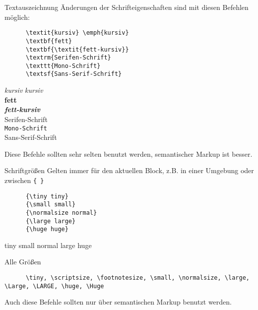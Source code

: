 \begin{frame}[fragile]{Textauszeichnung}
  Änderungen der Schrifteigenschaften sind mit diesen Befehlen möglich:
  \begin{CodeExample}{0.60}
    \begin{lstlisting}
      \textit{kursiv} \emph{kursiv}
      \textbf{fett}
      \textbf{\textit{fett-kursiv}}
      \textrm{Serifen-Schrift}
      \texttt{Mono-Schrift}
      \textsf{Sans-Serif-Schrift}
    \end{lstlisting}
  \CodeResult
    \textit{kursiv} \emph{kursiv} \\
    \textbf{fett} \\
    \textbf{\textit{fett-kursiv}} \\
    \textrm{Serifen-Schrift} \\
    \texttt{Mono-Schrift} \\
    \textsf{Sans-Serif-Schrift}
  \end{CodeExample}

  \vspace{1em}
  Diese Befehle sollten sehr selten benutzt werden, semantischer Markup ist besser.
\end{frame}

\begin{frame}[fragile]{Schriftgrößen}
  Gelten immer für den aktuellen Block, z.B. in einer Umgebung oder zwischen \lstinline+{ }+
  \begin{CodeExample}{0.48}
    \begin{lstlisting}
      {\tiny tiny}
      {\small small}
      {\normalsize normal}
      {\large large}
      {\huge huge}
    \end{lstlisting}
  \CodeResult
    {\tiny tiny}
    {\small small}
    {\normalsize normal}
    {\large large}
    {\huge huge}
  \end{CodeExample}
  \vspace{1em}
  \begin{tblock}{Alle Größen}
    \begin{lstlisting}
      \tiny, \scriptsize, \footnotesize, \small, \normalsize, \large, \Large, \LARGE, \huge, \Huge
    \end{lstlisting}
  \end{tblock}
  Auch diese Befehle sollten nur über semantischen Markup benutzt werden.
\end{frame}

